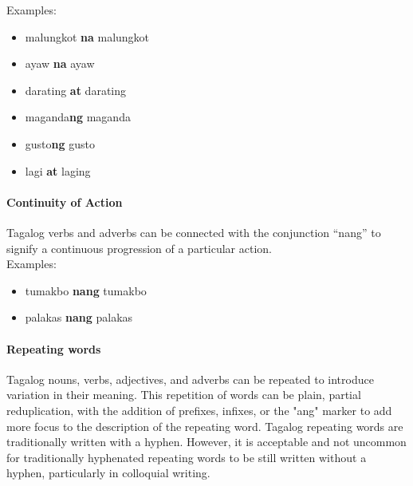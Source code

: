 \documentclass[journal]{./IEEE/IEEEtran}
\begin{document}
Examples:

\begin{multicols}{2}
    \begin{itemize}
      \item malungkot \textbf{na} malungkot \\
    
      \item ayaw \textbf{na} ayaw \\

      \item darating \textbf{at} darating\\
    
      \item maganda\textbf{ng} maganda \\
    
      \item gusto\textbf{ng} gusto\\
    
      \item lagi \textbf{at} laging \\
    \end{itemize}
\end{multicols}

\paragraph{Continuity of Action}

Tagalog verbs and adverbs can be connected with the conjunction “nang” to signify a continuous progression of a particular action. \\

Examples: \\

\begin{itemize}
  \item tumakbo \textbf{nang} tumakbo \\

  \item palakas \textbf{nang} palakas \\
\end{itemize}

\paragraph{Repeating words}

Tagalog nouns, verbs, adjectives, and adverbs can be repeated to introduce variation in their meaning. This repetition of words can be plain, partial reduplication, with the addition of prefixes, infixes, or the "ang" marker to add more focus to the description of the repeating word. Tagalog repeating words are traditionally written with a hyphen. However, it is acceptable and not uncommon for traditionally hyphenated repeating words to be still written without a hyphen, particularly in colloquial writing. \\
\end{document}
